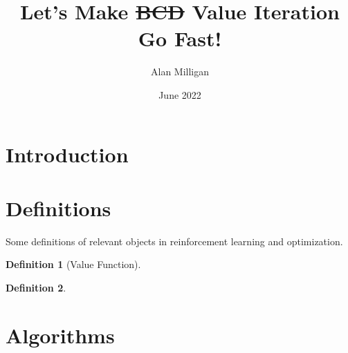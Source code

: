 \documentclass{article}
\title{Let's Make \sout{BCD} Value Iteration Go Fast!}
\author{Alan Milligan}
\date{June 2022}
\begin{document}
\theoremstyle{definition}
\newtheorem*{definition}{Definition}

\maketitle

\section{Introduction}



\section{Definitions}
Some definitions of relevant objects in reinforcement learning and optimization.

\begin{definition}[Value Function]
\end{definition}

\begin{definition}
\end{definition}


\section{Algorithms}
\end{document}
